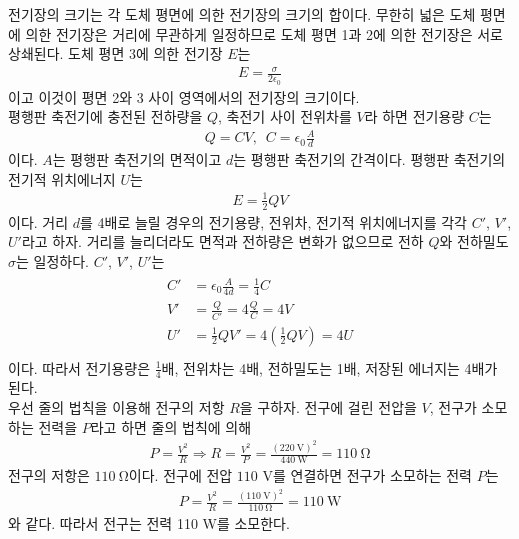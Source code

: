 \documentclass[tightenlines,floatfix,nofootinbib,superscriptaddress,fleqn]{revtex4}
\begin{document}
전기장의 크기는 각 도체 평면에 의한 전기장의 크기의 합이다. 무한히 넓은 도체 평면에 의한
전기장은 거리에 무관하게 일정하므로 도체 평면 1과 2에 의한 전기장은 서로 상쇄된다. 도체 평면
3에 의한 전기장 $E$는
\begin{align}
  E = \frac{\sigma}{2\epsilon_0}
\end{align}
이고 이것이 평면 2와 3 사이 영역에서의 전기장의 크기이다.
\\

평행판 축전기에 충전된 전하량을 $Q$, 축전기 사이 전위차를 $V$라 하면 전기용량 $C$는
\begin{align}
  Q = CV,\,\,\,C = \epsilon_0\frac{A}{d}
\end{align}
이다. $A$는 평행판 축전기의 면적이고 $d$는 평행판 축전기의 간격이다. 평행판 축전기의 전기적
위치에너지 $U$는
\begin{align}
  E = \frac{1}{2}QV
\end{align}
이다. 거리 $d$를 4배로 늘릴 경우의 전기용량, 전위차, 전기적 위치에너지를 각각 $C'$, 
$V'$, $U'$라고 하자. 거리를 늘리더라도 면적과 전하량은 변화가 없으므로 전하 $Q$와 
전하밀도 $\sigma$는 일정하다. $C'$, $V'$, $U'$는
\begin{align}
  \begin{split}
    C'& = \epsilon_0\frac{A}{4d} = \frac{1}{4}C \\
    V'& = \frac{Q}{C'} = 4\frac{Q}{C} = 4V \\
    U'& = \frac{1}{2}QV' = 4\left(\frac{1}{2}QV\right) = 4U\\ 
  \end{split}
\end{align}
이다. 따라서 전기용량은 $\frac{1}{4}$배, 전위차는 4배, 전하밀도는 1배, 저장된 에너지는 4배가
된다.
\\

우선 줄의 법칙을 이용해 전구의 저항 $R$을 구하자. 전구에 걸린 전압을 $V$, 전구가 소모하는 
전력을 $P$라고 하면 줄의 법칙에 의해
\begin{align}
  P = \frac{V^2}{R} \Longrightarrow R = \frac{V^2}{P} 
  = \frac{(220~\mathrm{V})^2}{440~\mathrm{W}} = 110~\mathrm{\Omega}
\end{align}
전구의 저항은 $110~\mathrm{\Omega}$이다.
전구에 전압 $110$ V를 연결하면 전구가 소모하는 전력 $P$는
\begin{align}
  P = \frac{V^2}{R} = \frac{(110~\mathrm{V})^2}{110~\mathrm{\Omega}}
  =110~\mathrm{W}
\end{align}
와 같다. 따라서 전구는 전력 110 W를 소모한다.
\\
\end{document}
